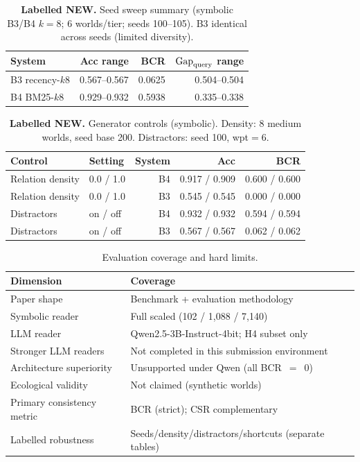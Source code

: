 \begin{table}[t]
\centering
\caption{\textbf{Labelled NEW.} Seed sweep summary (symbolic B3/B4 $k{=}8$; 6 worlds/tier; seeds 100--105). B3 identical across seeds (limited diversity).}
\label{tab:seeds}
\small
\begin{tabular}{lrrr}
\toprule
System & Acc range & BCR & $\mathrm{Gap}_{\mathrm{query}}$ range \\
\midrule
B3 recency-$k8$ & 0.567--0.567 & 0.0625 & 0.504--0.504 \\
B4 BM25-$k8$ & 0.929--0.932 & 0.5938 & 0.335--0.338 \\
\bottomrule
\end{tabular}
\end{table}

\begin{table}[t]
\centering
\caption{\textbf{Labelled NEW.} Generator controls (symbolic). Density: 8 medium worlds, seed base 200. Distractors: seed 100, wpt$=$6.}
\label{tab:density}
\small
\begin{tabular}{llrrr}
\toprule
Control & Setting & System & Acc & BCR \\
\midrule
Relation density & 0.0 / 1.0 & B4 & 0.917 / 0.909 & 0.600 / 0.600 \\
Relation density & 0.0 / 1.0 & B3 & 0.545 / 0.545 & 0.000 / 0.000 \\
Distractors & on / off & B4 & 0.932 / 0.932 & 0.594 / 0.594 \\
Distractors & on / off & B3 & 0.567 / 0.567 & 0.062 / 0.062 \\
\bottomrule
\end{tabular}
\end{table}

\begin{table}[t]
\centering
\caption{Evaluation coverage and hard limits.}
\label{tab:coverage}
\begin{tabular}{ll}
\toprule
Dimension & Coverage \\
\midrule
Paper shape & Benchmark + evaluation methodology \\
Symbolic reader & Full scaled (102 / 1{,}088 / 7{,}140) \\
LLM reader & Qwen2.5-3B-Instruct-4bit; H4 subset only \\
Stronger LLM readers & Not completed in this submission environment \\
Architecture superiority & Unsupported under Qwen (all BCR~$=$~0) \\
Ecological validity & Not claimed (synthetic worlds) \\
Primary consistency metric & BCR (strict); CSR complementary \\
Labelled robustness & Seeds/density/distractors/shortcuts (separate tables) \\
\bottomrule
\end{tabular}
\end{table}

